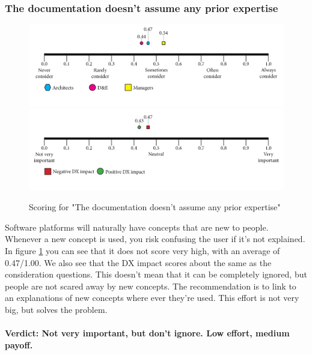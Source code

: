 \documentclass{article}
\begin{document}
\subsubsection{The documentation doesn’t assume any prior expertise}
\begin{figure}[H]
\centering
\includegraphics[width=\linewidth]{scorelines/aspect5.png}
\includegraphics[width=\linewidth]{dxscorelines/dxaspect5.png}
\caption{Scoring for "The documentation doesn’t assume any prior expertise"}
\label{fig:aspect5}
\end{figure}
Software platforms will naturally have concepts that are new to people. Whenever a new concept is used, you risk confusing the user if it's not explained. In figure \ref{fig:aspect5} you can see that it does not score very high, with an average of 0.47/1.00. We also see that the DX impact scores about the same as the consideration questions. This doesn't mean that it can be completely ignored, but people are not scared away by new concepts. The recommendation is to link to an explanations of new concepts where ever they're used. This effort is not very big, but solves the problem. \\ \\
\textbf{Verdict: Not very important, but don't ignore. Low effort, medium payoff.}
\end{document}
